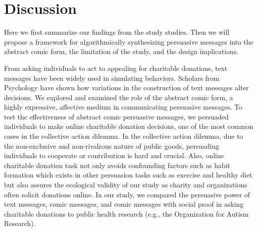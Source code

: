 \section{Discussion}
\label{sec:Discussion}
Here we first summarize our findings from the study studies. Then we will propose a framework for algorithmically synthesizing persuasive messages into the abstract comic form, the limitation of the study, and the design implications.

From asking individuals to act to appealing for charitable donations, text messages have been widely used in simulating behaviors. Scholars from Psychology have shown how variations in the construction of text messages alter decisions. We explored and examined the role of the abstract comic form, a highly expressive, affective medium in communicating persuasive messages. To test the effectiveness of abstract comic persuasive messages, we persuaded individuals to make online charitable donation decisions, one of the most common cases in the collective action dilemma. In the collective action dilemma, due to the non-exclusive and non-rivalrous nature of public goods, persuading individuals to cooperate or contribution is hard and crucial. Also, online charitable donation task not only avoids confounding factors such as habit formation which exists in other persuasion tasks such as exercise and healthy diet but also assures the ecological validity of our study as charity and organizations often solicit donations online. In our study, we compared the persuasive power of text messages, comic messages, and comic messages with social proof in asking charitable donations to public health research (e.g., the Organization for Autism Research).

